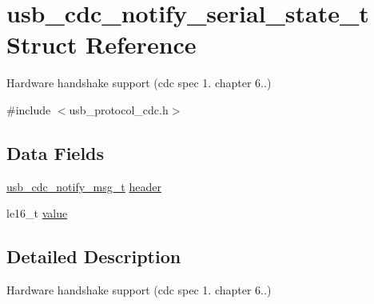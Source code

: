 \hypertarget{structusb__cdc__notify__serial__state__t}{
\section{usb\-\_\-cdc\-\_\-notify\-\_\-serial\-\_\-state\-\_\-t \-Struct \-Reference}
\label{structusb__cdc__notify__serial__state__t}
}


\-Hardware handshake support (cdc spec 1. chapter 6..)  




{\ttfamily \#include $<$usb\-\_\-protocol\-\_\-cdc.\-h$>$}

\subsection*{\-Data \-Fields}
\begin{DoxyCompactItemize}
\item 
\hyperlink{structusb__cdc__notify__msg__t}{usb\-\_\-cdc\-\_\-notify\-\_\-msg\-\_\-t} \hyperlink{structusb__cdc__notify__serial__state__t_aca542b1ab1aa7c5dc0d72bd31baf2d03}{header}
\item 
le16\-\_\-t \hyperlink{structusb__cdc__notify__serial__state__t_a4183db1e7c5174bce0453504b6e91463}{value}
\end{DoxyCompactItemize}


\subsection{\-Detailed \-Description}
\-Hardware handshake support (cdc spec 1. chapter 6..) 

